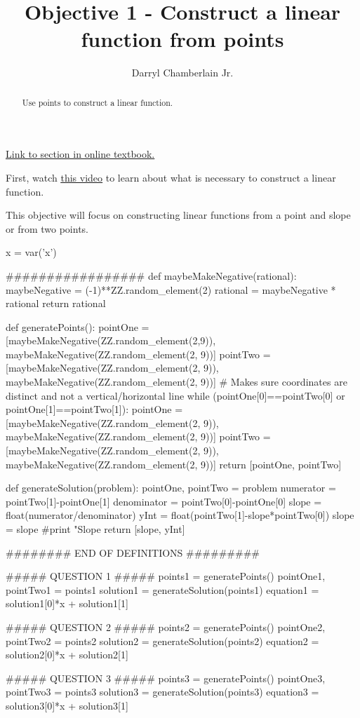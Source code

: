 \documentclass{ximera}
\author{Darryl Chamberlain Jr.}
\title{Objective 1 - Construct a linear function from points}
\begin{document}
\begin{abstract}
Use points to construct a linear function. 
\end{abstract}
\maketitle

\href{https://cnx.org/contents/mwjClAV_@8.1:62_eXnY6@14/Linear-Equations-in-One-Variable}{Link to section in online textbook.}


First, watch \underline{\href{https://mediasite.video.ufl.edu/Mediasite/Play/ea9a27e045aa4cbeb9211f7d64e96cb31d}{this video}} to learn about what is necessary to construct a linear function.

This objective will focus on constructing linear functions from a point and slope or from two points.

\begin{sagesilent}
x = var('x')

#################
def maybeMakeNegative(rational):
    maybeNegative = (-1)**ZZ.random_element(2)
    rational = maybeNegative * rational
    return rational

def generatePoints():
    pointOne = [maybeMakeNegative(ZZ.random_element(2,9)), maybeMakeNegative(ZZ.random_element(2, 9))]
    pointTwo = [maybeMakeNegative(ZZ.random_element(2, 9)), maybeMakeNegative(ZZ.random_element(2, 9))]
    # Makes sure coordinates are distinct and not a vertical/horizontal line
    while (pointOne[0]==pointTwo[0] or pointOne[1]==pointTwo[1]):
        pointOne = [maybeMakeNegative(ZZ.random_element(2, 9)), maybeMakeNegative(ZZ.random_element(2, 9))]
        pointTwo = [maybeMakeNegative(ZZ.random_element(2, 9)), maybeMakeNegative(ZZ.random_element(2, 9))]
    return [pointOne, pointTwo]

def generateSolution(problem):
    pointOne, pointTwo = problem
    numerator = pointTwo[1]-pointOne[1]
    denominator = pointTwo[0]-pointOne[0]
    slope = float(numerator/denominator)
    yInt = float(pointTwo[1]-slope*pointTwo[0])
    slope = slope
    #print "Slope %
    return [slope, yInt]

######## END OF DEFINITIONS #########

##### QUESTION 1 #####
points1 = generatePoints()
pointOne1, pointTwo1 = points1
solution1 = generateSolution(points1)
equation1 = solution1[0]*x + solution1[1]

##### QUESTION 2 #####
points2 = generatePoints()
pointOne2, pointTwo2 = points2
solution2 = generateSolution(points2)
equation2 = solution2[0]*x + solution2[1]

##### QUESTION 3 #####
points3 = generatePoints()
pointOne3, pointTwo3 = points3
solution3 = generateSolution(points3)
equation3 = solution3[0]*x + solution3[1]
\end{sagesilent}
\end{document}
